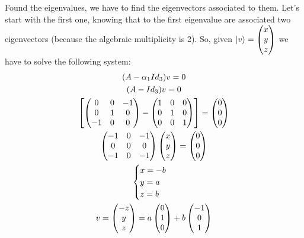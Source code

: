 \documentclass[12pt]{article}
\begin{document}
\begin{enumerate}
Found the eigenvalues, we have to find the eigenvectors associated to them.
Let's start with the first one, knowing that to the first eigenvalue
are associated two eigenvectors (because the algebraic multiplicity is 2).
So, given $\ket v =
\begin{pmatrix}
    x \\ y \\ z
\end{pmatrix}$
we have to solve the following system:
\begin{gather*}
(A-\alpha_1 Id_3)v=0 \\
(A-Id_3)v=0 \\
\mqty[
\begin{pmatrix}
0 & 0 & -1 \\ 0 & 1 & 0 \\ -1 & 0 & 0
\end{pmatrix}
-
\begin{pmatrix}
1 & 0 & 0 \\ 0 & 1 & 0 \\ 0 & 0 & 1
\end{pmatrix}]
=
\begin{pmatrix}
    0 \\ 0 \\ 0
\end{pmatrix} \\
\begin{pmatrix}
-1 & 0 & -1 \\ 0 & 0 & 0 \\ -1 & 0 & -1
\end{pmatrix}
\begin{pmatrix}
    x \\ y \\ z
\end{pmatrix}
=
\begin{pmatrix}
    0 \\ 0 \\ 0
\end{pmatrix} \\
\begin{cases}
    x=-b\\
    y=a\\
    z=b
\end{cases}\\
v =
    \begin{pmatrix}
        -z \\
        y \\
        z
    \end{pmatrix}
    =
    a
    \begin{pmatrix}
        0 \\
        1 \\
        0
    \end{pmatrix}
    +b
    \begin{pmatrix}
        -1 \\
        0 \\
        1
    \end{pmatrix}
\end{gather*}


\end{enumerate}
\end{document}
